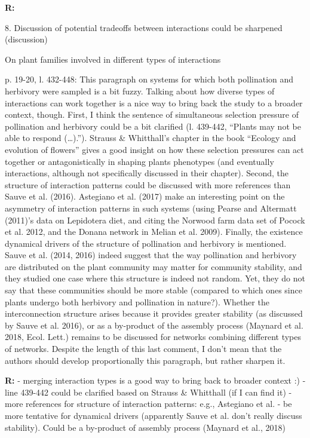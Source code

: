 \documentclass[12pt]{letter}
\newenvironment{refquote}{\bigskip \begin{it}}{\end{it}\smallskip}
\begin{document}
	\textbf{R:}


8. Discussion of potential tradeoffs between interactions could be sharpened (discussion)

	\begin{refquote}
		On plant families involved in different types of interactions

		p. 19-20, l. 432-448: This paragraph on systems for which both pollination and herbivory were sampled is a bit fuzzy. Talking about how diverse types of interactions can work together is a nice way to bring back the study to a broader context, though.
		First, I think the sentence of simultaneous selection pressure of pollination and herbivory could be a bit clarified (l. 439-442, “Plants may not be able to respond (…).”). Strauss & Whitthall’s chapter in the book “Ecology and evolution of flowers” gives a good insight on how these selection pressures can act together or antagonistically in shaping plants phenotypes (and eventually interactions, although not specifically discussed in their chapter).
		Second, the structure of interaction patterns could be discussed with more references than Sauve et al. (2016). Astegiano et al. (2017) make an interesting point on the asymmetry of interaction patterns in such systems (using Pearse and Altermatt (2011)’s data on Lepidotera diet, and citing the Norwood farm data set of Pocock et al. 2012, and the Donana network in Melian et al. 2009).
		Finally, the existence dynamical drivers of the structure of pollination and herbivory is mentioned. Sauve et al. (2014, 2016) indeed suggest that the way pollination and herbivory are distributed on the plant community may matter for community stability, and they studied one case where this structure is indeed not random. Yet, they do not say that these communities should be more stable (compared to which ones since plants undergo both herbivory and pollination in nature?). Whether the interconnection structure arises because it provides greater stability (as discussed by Sauve et al. 2016), or as a by-product of the assembly process (Maynard et al. 2018, Ecol. Lett.) remains to be discussed for networks combining different types of networks.
		Despite the length of this last comment, I don’t mean that the authors should develop proportionally this paragraph, but rather sharpen it.
	\end{refquote}


	\textbf{R:} - merging interaction types is a good way to bring back to broader context :) - line 439-442 could be clarified based on Strauss & Whitthall (if I can find it) - more references for structure of interaction patterns: e.g., Astegiano et al. - be more tentative for dynamical drivers (apparently Sauve et al. don't really discuss stability). Could be a by-product of assembly process (Maynard et al., 2018)
\end{document}
